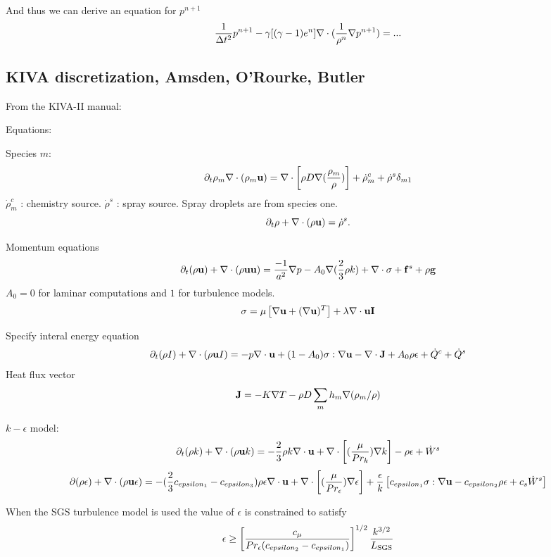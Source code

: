 \documentclass{article}
\begin{document}
And thus we can derive an equation for $p^{n+1}$
\[
   {1\over \Delta t^2} p^{n+1} - \gamma[(\gamma-1)e^n]\nabla\cdot( {1\over\rho^n}\nabla p^{n+1} ) = ...
\]

\subsection{KIVA discretization, Amsden, O'Rourke, Butler}


From the KIVA-II manual:


\newcommand{\rhoDot}{\dot{\rho}}
\newcommand{\Qdot}{\dot{Q}}
\newcommand{\Wdot}{\dot{W}}
\newcommand{\wDot}{\dot{w}}
\newcommand{\sigmav}{{\bf\sigma}}
\newcommand{\Tt}{\tilde{T}}

Equations:

Species $m$:
\[
   \partial_t \rho_m \grad\cdot( \rho_m \uv) = \grad\cdot\left[ \rho D \grad( {\rho_m \over \rho} )\right]
      + \rhoDot_m^c + \rhoDot^s \delta_{m1}
\]
$\rhoDot_m^c$ : chemistry source. $\rhoDot^s$ : spray source.
Spray droplets are from species one. 
\[
   \partial_t \rho +\grad\cdot( \rho \uv ) = \rhoDot^s.
\]

Momentum equations
\[
   \partial_t ( \rho \uv ) +\grad\cdot( \rho \uv \uv ) = {-1\over a^2 } \grad p 
      -A_0 \grad( {2\over3} \rho k) + \grad\cdot\sigmav + \fv^s + \rho \gv
\]
$A_0=0$ for laminar computations and $1$ for turbulence models.
\[
  \sigmav = \mu \left[ \grad\uv + (\grad\uv)^T \right] + \lambda \grad\cdot\uv \Iv
\]

Specify interal energy equation
\[
  \partial_t (\rho I) + \grad\cdot( \rho\uv I) = -p \grad\cdot\uv + (1-A_0)\sigmav:\grad\uv
                - \grad\cdot\Jv + A_0 \rho \epsilon + \Qdot^c + \Qdot^s
\]
Heat flux vector
\[
   {\bf J} = -K\nabla T - \rho D\sum_m h_m \nabla( \rho_m/\rho )
\]

$k-\epsilon$ model:
\[
   \partial_t (\rho k) + \grad\cdot( \rho \uv k) = - {2\over 3} \rho k \grad\cdot\uv 
     + \grad\cdot \left[ ({\mu \over Pr_k }) \grad k\right] - \rho\epsilon + \Wdot^s
\]
\[
  \partial(\rho\epsilon) + \grad\cdot( \rho \uv \epsilon) 
      = -( {2\over 3} c_{epsilon_1} -c_{epsilon_3} ) \rho \epsilon\grad\cdot\uv 
        +\grad\cdot \left[ ({\mu \over Pr_\epsilon }) \grad \epsilon \right] 
       + {\epsilon\over k}\left[ c_{epsilon_1}\sigmav:\grad\uv - c_{epsilon_2}\rho\epsilon + c_s \Wdot^s\right]
\]

When the SGS turbulence model is used the value of $\epsilon$ is constrained to satisfy
\[
   \epsilon \ge \left[ c_\mu \over Pr_\epsilon (c_{epsilon_2} -c_{epsilon_1})\right]^{1/2}
        {k^{3/2}\over L_{\rm SGS}}
\]
\end{document}
